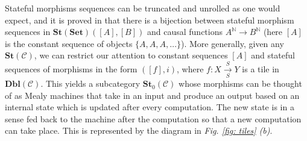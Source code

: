 \documentclass[11pt,a4paper,openright,twoside]{report}
\theoremstyle{plain}
\theoremstyle{definition}
\begin{document}
Stateful morphisms sequences can be truncated and unrolled as one would expect, and it is proved in \cite{sprunger2019differentiable} that there is a bijection between stateful morphism sequences in $\mathbf{St}(\mathbf{Set})([A],[B])$ and causal functions $A^{\mathbb{N}} \to B^{\mathbb{N}}$ (here $[A]$ is the constant sequence of objects $\{A,A,A,\dots\}$). More generally, given any $\mathbf{St}(\mathcal{C})$, we can restrict our attention to constant sequences $[A]$ and stateful sequences of morphisms in the form $([f],i)$, where $f:X \overset{S}{\underset{S}\longrightarrow} Y$ is a tile in $\mathbf{Dbl}(\mathcal{C})$. This yields a subcategory $\mathbf{St}_0(\mathcal{C})$ whose morphisms can be thought of as Mealy machines that take in an input and produce an output based on an internal state which is updated after every computation. The new state is in a sense fed back to the machine after the computation so that a new computation can take place. This is represented by the diagram in \textit{Fig. \ref{fig: tiles} (b)}.
\end{document}
